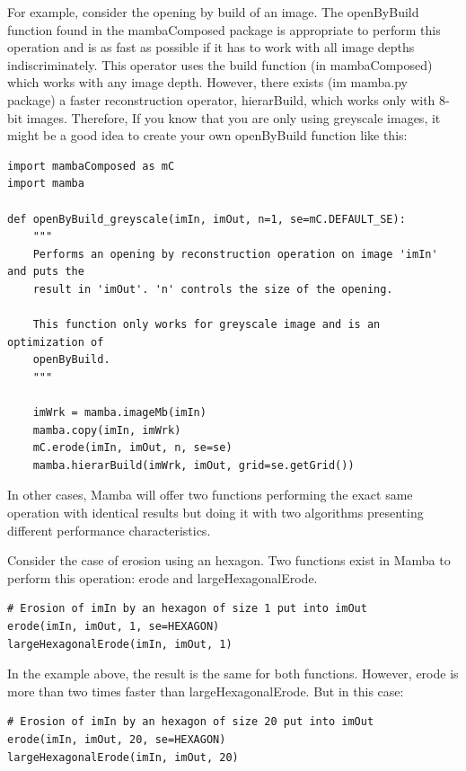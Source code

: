 \documentclass[a4paper,10pt,oneside]{article}
\begin{document}
For example, consider the opening by build of an image. The openByBuild function
found in the mambaComposed package is appropriate to perform this operation and
is as fast as possible if it has to work with all image depths indiscriminately.
This operator uses the build function (in mambaComposed) which works with any image
depth. However, there exists (im mamba.py package) a faster reconstruction operator,
hierarBuild, which works only with 8-bit images. Therefore, If you know that you are
only using greyscale images, it might be a good idea to create your own openByBuild
function like this:

\lstset{language=Python}
\begin{lstlisting}
import mambaComposed as mC
import mamba

def openByBuild_greyscale(imIn, imOut, n=1, se=mC.DEFAULT_SE):
    """
    Performs an opening by reconstruction operation on image 'imIn' and puts the
    result in 'imOut'. 'n' controls the size of the opening.
    
    This function only works for greyscale image and is an optimization of
    openByBuild.
    """
    
    imWrk = mamba.imageMb(imIn)
    mamba.copy(imIn, imWrk)
    mC.erode(imIn, imOut, n, se=se)
    mamba.hierarBuild(imWrk, imOut, grid=se.getGrid())
\end{lstlisting}

In other cases, Mamba will offer two functions performing the exact same 
operation with identical results but doing it with two algorithms presenting
different performance characteristics.

Consider the case of erosion using an hexagon. Two functions exist in Mamba to
perform this operation: erode and largeHexagonalErode.

\lstset{language=Python}
\begin{lstlisting}
# Erosion of imIn by an hexagon of size 1 put into imOut
erode(imIn, imOut, 1, se=HEXAGON)
largeHexagonalErode(imIn, imOut, 1)
\end{lstlisting}

In the example above, the result is the same for both functions. However, erode is
more than two times faster than largeHexagonalErode. But in this case:

\lstset{language=Python}
\begin{lstlisting}
# Erosion of imIn by an hexagon of size 20 put into imOut
erode(imIn, imOut, 20, se=HEXAGON)
largeHexagonalErode(imIn, imOut, 20)
\end{lstlisting}
\end{document}
